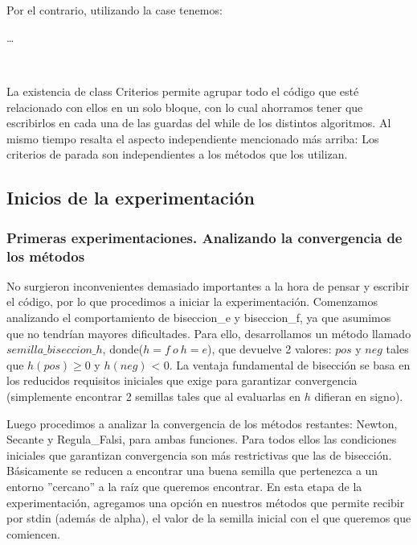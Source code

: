 ~


~

Por el contrario, utilizando la case tenemos:

\begin{algorithmic}
	\While{$!criterios.parar(parameters)$}
		\State \ldots
	\EndWhile
\end{algorithmic}

~

La existencia de class Criterios permite agrupar todo el código que esté relacionado con ellos en un solo bloque, con lo cual ahorramos tener que escribirlos
en cada una de las guardas del while de los distintos algoritmos. Al mismo tiempo resalta el aspecto independiente mencionado más arriba: Los criterios de parada son 
independientes a los métodos que los utilizan.


\subsection{Inicios de la experimentación}

\subsubsection{Primeras experimentaciones. Analizando la convergencia de los métodos}

No surgieron inconvenientes demasiado importantes a la hora de pensar y escribir el código, por lo que procedimos a iniciar la experimentación.
Comenzamos analizando el comportamiento de biseccion\_e y biseccion\_f, ya que asumimos que no tendrían mayores dificultades. Para ello, desarrollamos un método llamado
$semilla\_biseccion\_h$, donde($h = f \ o \ h=e$), que devuelve 2 valores: $pos$ y $neg$ tales que $h(pos)$ y $h(neg)$ < 0. La ventaja fundamental de bisección
se basa en los reducidos requisitos iniciales que exige para garantizar convergencia (simplemente encontrar 2 semillas tales que al evaluarlas en $h$ difieran en signo).

Luego procedimos a analizar la convergencia de los métodos restantes: Newton, Secante y Regula\_Falsi, para ambas funciones. Para todos ellos las condiciones iniciales que garantizan
convergencia son más restrictivas que las de bisección. Básicamente se reducen a encontrar una buena semilla que pertenezca a un entorno ''cercano'' a la raíz que queremos encontrar.
En esta etapa de la experimentación, agregamos una opción en nuestros métodos que permite recibir por stdin (además de alpha), el valor de la semilla inicial con el que queremos que comiencen. 










